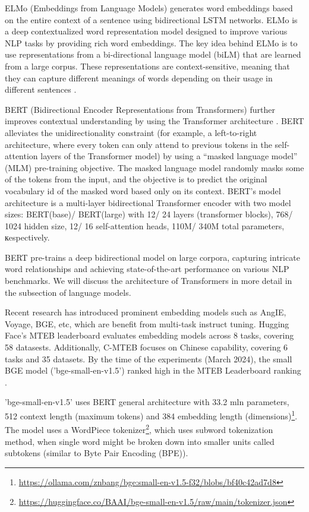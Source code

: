 ELMo (Embeddings from Language Models) generates word embeddings based on the entire context of a sentence using bidirectional LSTM networks. ELMo is a deep contextualized word representation model designed to improve various NLP tasks by providing rich word embeddings. The key idea behind ELMo is to use representations from a bi-directional language model (biLM) that are learned from a large corpus. These representations are context-sensitive, meaning that they can capture different meanings of words depending on their usage in different sentences \cite{Peters.15Feb2018}.

BERT (Bidirectional Encoder Representations from Transformers) further improves contextual understanding by using the Transformer architecture \cite{Devlin.11Oct2018}. BERT alleviates the unidirectionality constraint (for example, a left-to-right architecture, where every token can only attend to previous tokens in the self-attention layers of the Transformer model) by using a “masked language model” (MLM) pre-training objective. The masked language model randomly masks some of the tokens from the input, and the objective is to predict the original vocabulary id of the masked word based only on its context. BERT’s model architecture is a multi-layer bidirectional Transformer \cite{Vaswani.12Jun2017} encoder with two model sizes: BERT(base)/  BERT(large) with 12/ 24 layers (transformer blocks), 768/ 1024 hidden size, 12/ 16 self-attention heads, 110M/ 340M total parameters, кespectively. 

BERT pre-trains a deep bidirectional model on large corpora, capturing intricate word relationships and achieving state-of-the-art performance on various NLP benchmarks. We will discuss the architecture of Transformers in more detail in the subsection of language models.

Recent research has introduced prominent embedding models such as AngIE, Voyage, BGE, etc, which are benefit from multi-task
instruct tuning. Hugging Face’s MTEB leaderboard evaluates embedding models across 8 tasks, covering 58 datasests. Additionally, C-MTEB focuses on Chinese capability, covering 6 tasks and 35 datasets. By the time of the experiments (March 2024), the small BGE model ('bge-small-en-v1.5') ranked high in the MTEB Leaderboard ranking \cite{Gao.18Dec2023}.

'bge-small-en-v1.5' uses BERT general architecture with 33.2 mln parameters, 512 context length (maximum tokens) and 384 embedding length (dimensions)\footnote{\url{https://ollama.com/znbang/bge:small-en-v1.5-f32/blobs/bf40c42ad7d8}}. The model uses a WordPiece tokenizer\footnote{\url{https://huggingface.co/BAAI/bge-small-en-v1.5/raw/main/tokenizer.json}}, which uses subword tokenization method, when single word might be broken down into smaller units called subtokens (similar to Byte Pair Encoding (BPE)).

